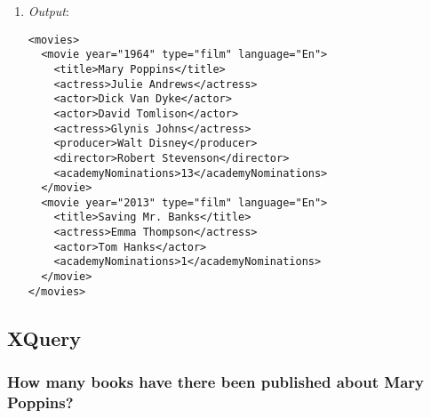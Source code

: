 \documentclass[11pt]{article}
\begin{document}
\begin{enumerate}
\item \textit{Output}:
\begin{verbatim}
<movies>
  <movie year="1964" type="film" language="En">
    <title>Mary Poppins</title>
    <actress>Julie Andrews</actress>
    <actor>Dick Van Dyke</actor>
    <actor>David Tomlison</actor>
    <actress>Glynis Johns</actress>
    <producer>Walt Disney</producer>
    <director>Robert Stevenson</director>
    <academyNominations>13</academyNominations>
  </movie>
  <movie year="2013" type="film" language="En">
    <title>Saving Mr. Banks</title>
    <actress>Emma Thompson</actress>
    <actor>Tom Hanks</actor>
    <academyNominations>1</academyNominations>
  </movie>
</movies>
\end{verbatim} 
\end{enumerate}


\subsection{XQuery}

\subsubsection{How many books have there been published about Mary Poppins?}
\end{document}
